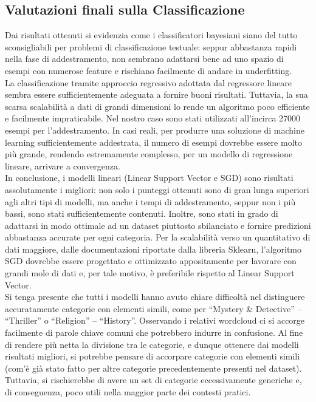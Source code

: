 \documentclass[12pt,oneside]{article}
\begin{document}
    \newpage
    \begin{enumerate}
    \subsection{Valutazioni finali sulla Classificazione}
    \begin{justify}
    Dai risultati ottenuti si evidenzia come i classificatori bayesiani siano del tutto sconsigliabili per problemi di classificazione testuale: seppur abbastanza rapidi nella fase di addestramento, non sembrano adattarsi bene ad uno spazio di esempi con numerose feature e rischiano facilmente di andare in underfitting.\\
    La classificazione tramite approccio regressivo adottata dal regressore lineare sembra essere sufficientemente adeguata a fornire buoni risultati. Tuttavia, la sua scarsa scalabilità a dati di grandi dimensioni lo rende un algoritmo poco efficiente e facilmente impraticabile. Nel nostro caso sono stati utilizzati all’incirca 27000 esempi per l’addestramento. In casi reali, per produrre una soluzione di machine learning sufficientemente addestrata, il numero di esempi dovrebbe essere molto più grande, rendendo estremamente complesso, per un modello di regressione lineare, arrivare a convergenza.\\
    In conclusione, i modelli lineari (Linear Support Vector e SGD) sono risultati assolutamente i migliori: non solo i punteggi ottenuti sono di gran lunga superiori agli altri tipi di modelli, ma anche i tempi di addestramento, seppur non i più bassi, sono stati sufficientemente contenuti. Inoltre, sono stati in grado di adattarsi in modo ottimale ad un dataset piuttosto sbilanciato e fornire predizioni abbastanza accurate per ogni categoria. Per la scalabilità verso un quantitativo di dati maggiore, dalle documentazioni riportate dalla libreria Sklearn, l’algoritmo SGD dovrebbe essere progettato e ottimizzato appositamente per lavorare con grandi mole di dati e, per tale motivo, è preferibile rispetto al Linear Support Vector.\\
    Si tenga presente che tutti i modelli hanno avuto chiare difficoltà nel distinguere accuratamente categorie con elementi simili, come per “Mystery \& Detective” – “Thriller” o “Religion” – “History”. Osservando i relativi wordcloud ci si accorge facilmente di parole chiave comuni che potrebbero indurre in confusione. Al fine di rendere più netta la divisione tra le categorie, e dunque ottenere dai modelli risultati migliori, si potrebbe pensare di accorpare categorie con elementi simili (com’è già stato fatto per altre categorie precedentemente presenti nel dataset). Tuttavia, si rischierebbe di avere un set di categorie eccessivamente generiche e, di conseguenza, poco utili nella maggior parte dei contesti pratici.
    \end{justify}
    \end{enumerate}
\end{document}
